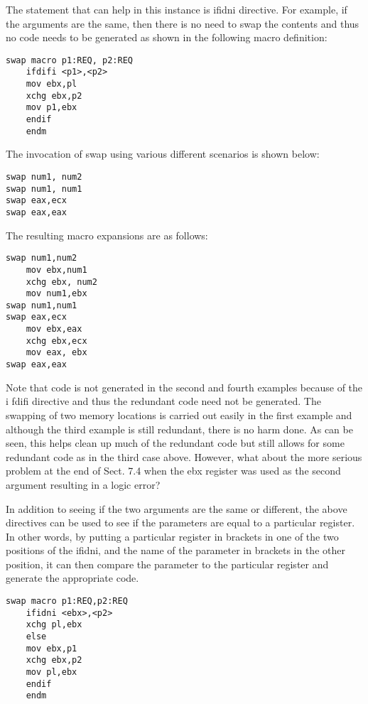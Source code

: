 \documentclass[10pt]{article}
\begin{document}
The statement that can help in this instance is ifidni directive. For example, if the arguments are the same, then there is no need to swap the contents and thus no code needs to be generated as shown in the following macro definition:

\begin{verbatim}
swap macro p1:REQ, p2:REQ
    ifdifi <p1>,<p2>
    mov ebx,pl
    xchg ebx,p2
    mov p1,ebx
    endif
    endm
\end{verbatim}

The invocation of swap using various different scenarios is shown below:

\begin{verbatim}
swap num1, num2
swap num1, num1
swap eax,ecx
swap eax,eax
\end{verbatim}

The resulting macro expansions are as follows:

\begin{verbatim}
swap num1,num2
    mov ebx,num1
    xchg ebx, num2
    mov num1,ebx
swap num1,num1
swap eax,ecx
    mov ebx,eax
    xchg ebx,ecx
    mov eax, ebx
swap eax,eax
\end{verbatim}

Note that code is not generated in the second and fourth examples because of the i fdifi directive and thus the redundant code need not be generated. The swapping of two memory locations is carried out easily in the first example and although the third example is still redundant, there is no harm done. As can be seen, this helps clean up much of the redundant code but still allows for some redundant code as in the third case above. However, what about the more serious problem at the end of Sect. 7.4 when the ebx register was used as the second argument resulting in a logic error?

In addition to seeing if the two arguments are the same or different, the above directives can be used to see if the parameters are equal to a particular register. In other words, by putting a particular register in brackets in one of the two positions of the ifidni, and the name of the parameter in brackets in the other position, it can then compare the parameter to the particular register and generate the appropriate code.

\begin{verbatim}
swap macro p1:REQ,p2:REQ
    ifidni <ebx>,<p2>
    xchg pl,ebx
    else
    mov ebx,p1
    xchg ebx,p2
    mov pl,ebx
    endif
    endm
\end{verbatim}
\end{document}
